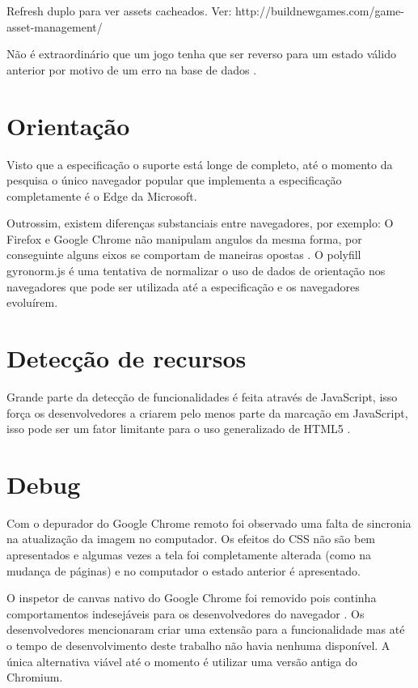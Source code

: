 \begin{draft}
Refresh duplo para ver assets cacheados. Ver:
http://buildnewgames.com/game-asset-management/

Não é extraordinário que um jogo tenha que ser reverso para um estado
válido anterior por motivo de um erro na base de dados \autocite[pp.
5]{browserGamesTechnologyAndFuture}.


\section{Orientação}

Visto que a especificação o suporte está longe de completo, até
o momento da pesquisa o único navegador popular que implementa a
especificação completamente é o Edge da Microsoft.

Outrossim, existem diferenças substanciais entre navegadores, por
exemplo: O Firefox e Google Chrome não manipulam angulos da mesma
forma, por conseguinte alguns eixos se comportam de maneiras opostas
\autocite{mdnOrientation}. O polyfill gyronorm.js é uma tentativa de
normalizar o uso de dados de orientação nos navegadores que pode ser
utilizada até a especificação e os navegadores evoluírem.

\section{Detecção de recursos}

Grande parte da detecção de funcionalidades é feita através de
JavaScript, isso força os desenvolvedores a criarem pelo menos parte da
marcação em JavaScript, isso pode ser um fator limitante para o uso
generalizado de HTML5 \autocite{diveIntohtml}.

\section{Debug}

Com o depurador do Google Chrome remoto foi observado uma falta de
sincronia na atualização da imagem no computador. Os efeitos do CSS
não são bem apresentados e algumas vezes a tela foi completamente
alterada (como na mudança de páginas) e no computador o estado
anterior é apresentado.

O inspetor de canvas nativo do Google Chrome foi removido pois continha
comportamentos indesejáveis para os desenvolvedores do navegador
\autocite{canvasinspector}. Os desenvolvedores mencionaram criar uma
extensão para a funcionalidade mas até o tempo de desenvolvimento
deste trabalho não havia nenhuma disponível. A única alternativa
viável até o momento é utilizar uma versão antiga do Chromium.


\end{draft}
